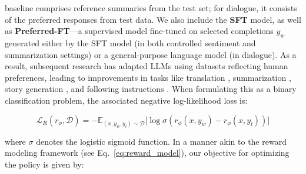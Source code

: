 baseline comprises reference summaries from the test set; for dialogue, it consists of the preferred responses from test data. We also include the \textbf{SFT} model, as well as \textbf{Preferred-FT}—a supervised model fine-tuned on selected completions $y_w$ generated either by the SFT model (in both controlled sentiment and summarization settings) or a general-purpose language model (in dialogue). As a result, subsequent research has adapted LLMs using datasets reflecting human preferences, leading to improvements in tasks like translation \citep{kreutzer-etal-2018-reliability}, summarization \citep{stiennon2022learning,ziegler2020finetuning}, story generation \citep{ziegler2020finetuning}, and following instructions \citep{ouyang2022training,ramamurthy2023is}. When formulating this as a binary classification problem, the associated negative log-likelihood loss is:

\begin{equation}\label{eq:reward_model}
    \mathcal{L}_R(r_{\phi}, \mathcal{D}) = -\mathbb{E}_{(x, y_w, y_l)\sim \mathcal{D}}\bigl[\log \sigma(r_{\phi}(x, y_w)- r_{\phi}(x, y_l))\bigr]
\end{equation}

where $\sigma$ denotes the logistic sigmoid function. In a manner akin to the reward modeling framework (see Eq.~\ref{eq:reward_model}), our objective for optimizing the policy is given by:

